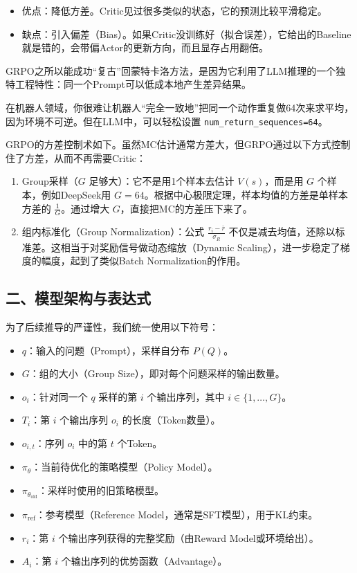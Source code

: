\begin{itemize}
\tightlist
\item
  优点：降低方差。Critic见过很多类似的状态，它的预测比较平滑稳定。
\item
  缺点：引入偏差（Bias）。如果Critic没训练好（拟合误差），它给出的Baseline就是错的，会带偏Actor的更新方向，而且显存占用翻倍。
\end{itemize}

GRPO之所以能成功``复古''回蒙特卡洛方法，是因为它利用了LLM推理的一个独特工程特性：同一个Prompt可以低成本地产生差异结果。

在机器人领域，你很难让机器人``完全一致地''把同一个动作重复做64次来求平均，因为环境不可逆。但在LLM中，可以轻松设置 \texttt{num\_return\_sequences=64}。

GRPO的方差控制术如下。虽然MC估计通常方差大，但GRPO通过以下方式控制住了方差，从而不再需要Critic：

\begin{enumerate}
\def\labelenumi{\arabic{enumi}.}
\tightlist
\item
  Group采样（\(G\) 足够大）：它不是用1个样本去估计 \(V(s)\)，而是用 \(G\) 个样本，例如DeepSeek用 \(G=64\)。根据中心极限定理，样本均值的方差是单样本方差的 \(\frac{1}{G}\)。通过增大 \(G\)，直接把MC的方差压下来了。
\item
  组内标准化（Group Normalization）：公式 \(\frac{r_i-\bar{r}}{\sigma_R}\) 不仅是减去均值，还除以标准差。这相当于对奖励信号做动态缩放（Dynamic Scaling），进一步稳定了梯度的幅度，起到了类似Batch Normalization的作用。
\end{enumerate}

\hypertarget{ux4e8cux6a21ux578bux67b6ux6784ux4e0eux8868ux8fbeux5f0f}{%
\subsection{二、模型架构与表达式}\label{ux4e8cux6a21ux578bux67b6ux6784ux4e0eux8868ux8fbeux5f0f}}

为了后续推导的严谨性，我们统一使用以下符号：

\begin{itemize}
\tightlist
\item
  \(q\)：输入的问题（Prompt），采样自分布 \(P(Q)\)。
\item
  \(G\)：组的大小（Group Size），即对每个问题采样的输出数量。
\item
  \(o_i\)：针对同一个 \(q\) 采样的第 \(i\) 个输出序列，其中 \(i\in\{1,\ldots,G\}\)。
\item
  \(T_i\)：第 \(i\) 个输出序列 \(o_i\) 的长度（Token数量）。
\item
  \(o_{i,t}\)：序列 \(o_i\) 中的第 \(t\) 个Token。
\item
  \(\pi_{\theta}\)：当前待优化的策略模型（Policy Model）。
\item
  \(\pi_{\theta_{\mathrm{old}}}\)：采样时使用的旧策略模型。
\item
  \(\pi_{\mathrm{ref}}\)：参考模型（Reference Model，通常是SFT模型），用于KL约束。
\item
  \(r_i\)：第 \(i\) 个输出序列获得的完整奖励（由Reward Model或环境给出）。
\item
  \(A_i\)：第 \(i\) 个输出序列的优势函数（Advantage）。
\end{itemize}

